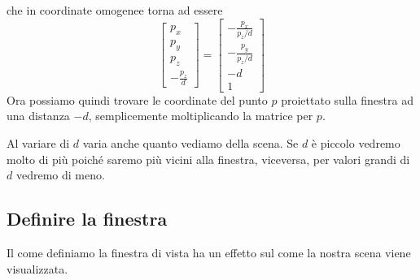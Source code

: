 che in coordinate omogenee torna ad essere
\[
	\begin{bmatrix}
		p_x \\ p_y \\ p_z \\ -\frac{p_z}{d}
	\end{bmatrix} =
	\begin{bmatrix}
		-\frac{p_x}{p_z / d} \\
		-\frac{p_y}{p_z / d} \\
		-d                   \\
		1
	\end{bmatrix}
\]
Ora possiamo quindi trovare le coordinate del punto $p$ proiettato sulla finestra ad una distanza $-d$, semplicemente
moltiplicando la matrice per $p$.

Al variare di $d$ varia anche quanto vediamo della scena. Se $d$ \`e piccolo vedremo molto di pi\`u poich\'e saremo
pi\`u vicini alla finestra, viceversa, per valori grandi di $d$ vedremo di meno.

\subsection{Definire la finestra}
Il come definiamo la finestra di vista ha un effetto sul come la nostra scena viene visualizzata.